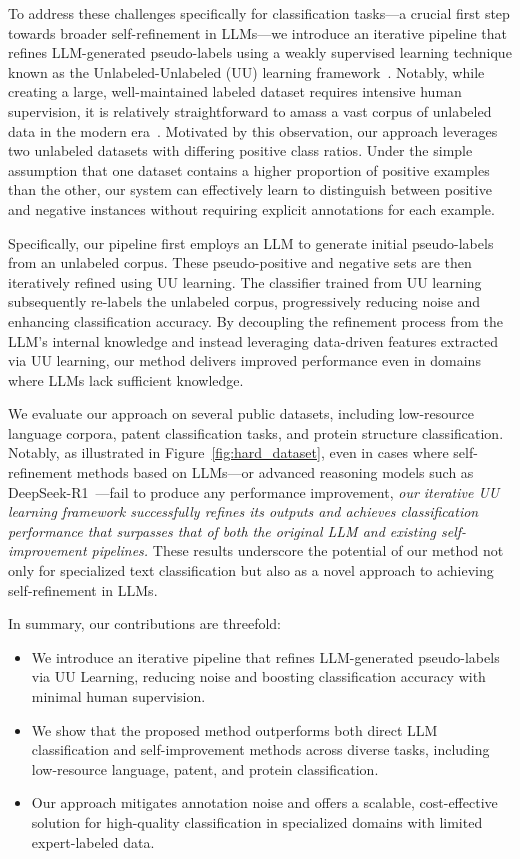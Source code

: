 To address these challenges specifically for classification tasks—a crucial first step towards broader self-refinement in LLMs—we introduce an iterative pipeline that refines LLM-generated pseudo-labels using a weakly supervised learning technique known as the Unlabeled-Unlabeled (UU) learning framework~\citep{Lu2019-sd,Lu2020-dx}. Notably, while creating a large, well-maintained labeled dataset requires intensive human supervision, it is relatively straightforward to amass a vast corpus of unlabeled data in the modern era~\citep{sagiroglu2013big}. Motivated by this observation, our approach leverages two unlabeled datasets with differing positive class ratios. Under the simple assumption that one dataset contains a higher proportion of positive examples than the other, our system can effectively learn to distinguish between positive and negative instances without requiring explicit annotations for each example.%

Specifically, our pipeline first employs an LLM to generate initial pseudo-labels from an unlabeled corpus. These pseudo-positive and negative sets are then iteratively refined using UU learning. The classifier trained from UU learning subsequently re-labels the unlabeled corpus, progressively reducing noise and enhancing classification accuracy. By decoupling the refinement process from the LLM's internal knowledge and instead leveraging data-driven features extracted via UU learning, our method delivers improved performance even in domains where LLMs lack sufficient knowledge.

We evaluate our approach on several public datasets, including low-resource language corpora, patent classification tasks, and protein structure classification. Notably, as illustrated in Figure~\ref{fig:hard_dataset}, even in cases where self-refinement methods based on LLMs—or advanced reasoning models such as DeepSeek-R1~\citep{DeepSeek-AI2025-vk}—fail to produce any performance improvement, \emph{our iterative UU learning framework successfully refines its outputs and achieves classification performance that surpasses that of both the original LLM and existing self-improvement pipelines.} These results underscore the potential of our method not only for specialized text classification but also as a novel approach to achieving self-refinement in LLMs.

In summary, our contributions are threefold:
\begin{itemize}
\item We introduce an iterative pipeline that refines LLM-generated pseudo-labels via UU Learning, reducing noise and boosting classification accuracy with minimal human supervision.
\item We show that the proposed method outperforms both direct LLM classification and self-improvement methods across diverse tasks, including low-resource language, patent, and protein classification.
\item Our approach mitigates annotation noise and offers a scalable, cost-effective solution for high-quality classification in specialized domains with limited expert-labeled data.
\end{itemize}
